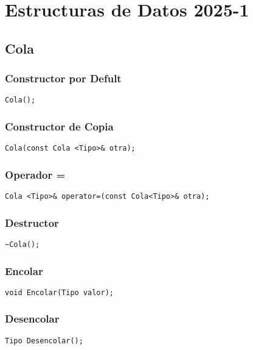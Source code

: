 \documentclass[11pt]{article}
\date{\today}
\title{}
\begin{document}
\tableofcontents

\section{Estructuras de Datos 2025-1}
\label{sec:org318ee10}

\subsection{Cola}
\label{sec:org2ef06ec}
\subsubsection{Constructor por Defult}
\label{sec:org768e0b5}
\begin{verbatim}
Cola(); 
\end{verbatim}
\subsubsection{Constructor de Copia}
\label{sec:org55420ba}
\begin{verbatim}
Cola(const Cola <Tipo>& otra); 
\end{verbatim}
\subsubsection{Operador =}
\label{sec:org465d712}
\begin{verbatim}
Cola <Tipo>& operator=(const Cola<Tipo>& otra);  
\end{verbatim}
\subsubsection{Destructor}
\label{sec:org3de525a}
\begin{verbatim}
~Cola(); 
\end{verbatim}
\subsubsection{Encolar}
\label{sec:org67547e0}
\begin{verbatim}
void Encolar(Tipo valor);
\end{verbatim}
\subsubsection{Desencolar}
\label{sec:org70ef3a8}
\begin{verbatim}
Tipo Desencolar(); 
\end{verbatim}
\end{document}
